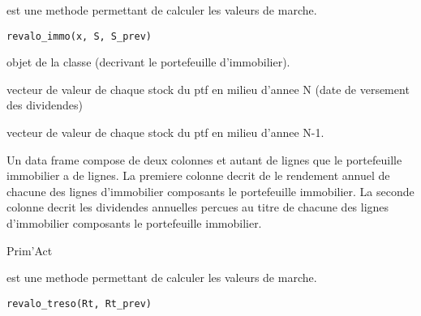 \documentclass[a4paper]{book}
\begin{document}
%
\begin{Description}\relax
{} est une methode permettant de calculer les valeurs de marche.
\end{Description}
%
\begin{Usage}
\begin{verbatim}
revalo_immo(x, S, S_prev)
\end{verbatim}
\end{Usage}
%
\begin{Arguments}
\begin{ldescription}
\item[\code{x}] objet de la classe  (decrivant le portefeuille d'immobilier).

\item[\code{S}] vecteur  de valeur de chaque stock du ptf en milieu d'annee N (date de versement des dividendes)

\item[\code{S\_prev}] vecteur   de valeur de chaque stock du ptf en milieu d'annee N-1.
\end{ldescription}
\end{Arguments}
%
\begin{Value}
Un data frame compose de deux colonnes et autant de lignes que le portefeuille immobilier a de lignes.
La premiere colonne decrit de le rendement annuel de chacune des lignes d'immobilier composants le portefeuille immobilier.
La seconde colonne decrit les dividendes annuelles percues au titre de chacune des lignes d'immobilier composants le portefeuille immobilier.
\end{Value}
%
\begin{Author}\relax
Prim'Act
\end{Author}
%
\begin{Description}\relax
{} est une methode permettant de calculer les valeurs de marche.
\end{Description}
%
\begin{Usage}
\begin{verbatim}
revalo_treso(Rt, Rt_prev)
\end{verbatim}
\end{Usage}
\end{document}
